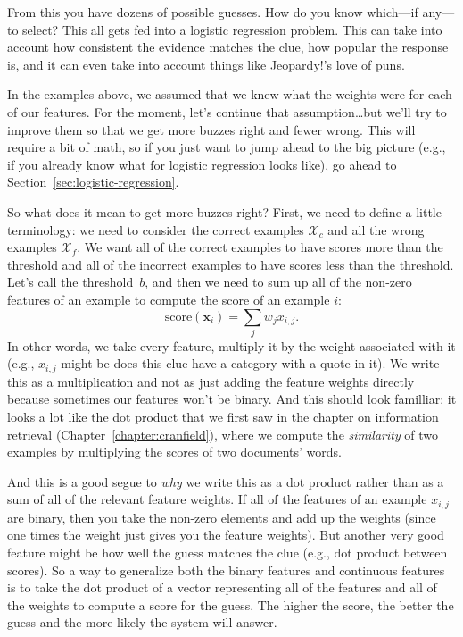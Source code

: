 From this you have dozens of possible guesses.  How do you know which---if
any—to select?  This all gets fed into a logistic regression problem.  This
can take into account how consistent the evidence matches the clue, how
popular the response is, and it can even take into account things like
Jeopardy!’s love of puns.

In the examples above, we assumed that we knew what the weights were for each
of our features.
%
For the moment, let's continue that assumption\dots but we'll try to improve
them so that we get more buzzes right and fewer wrong.
%
This will require a bit of math, so if you just want to jump ahead to the big
picture (e.g., if you already know what  for logistic regression
looks like), go ahead to Section~\ref{sec:logistic-regression}.

So what does it mean to get more buzzes right?  First, we need to define a
little terminology: we need to consider the correct examples $\mathcal{X}_c$
and all the wrong examples $\mathcal{X}_f$.
%
We want all of the correct examples to have scores more than the threshold and
all of the incorrect examples to have scores less than the threshold.
%
Let's call the threshold~$b$, and then we need to sum up all of the non-zero
features of an example to compute the score of an example $i$:
\begin{equation}
  \mbox{score}({\bm x}_i) = \sum_{j} w_j x_{i,j}.
  \label{eq:lr-dot}
\end{equation}
In other words, we take every feature, multiply it by the weight associated
with it (e.g., $x_{i,j}$ might be does this clue have a category with a quote
in it).
%
We write this as a multiplication and not as just adding the feature weights
directly because sometimes our features won't be binary.
%
And this should look familliar: it looks a lot like the dot product that we
first saw in the chapter on information retrieval
(Chapter~\ref{chapter:cranfield}), where we compute the \emph{similarity} of
two examples by multiplying the \tfidf{} scores of two documents' words.

And this is a good segue to \emph{why} we write this as a dot product rather
than as a sum of all of the relevant feature weights.
%
If all of the features of an example $x_{i,j}$ are binary, then you take the
non-zero elements and add up the weights (since one times the weight just
gives you the feature weights).
%
But another very good feature might be how well the guess matches the clue
(e.g., dot product between \tfidf{} scores).
%
So a way to generalize both the binary features and continuous features is to
take the dot product of a vector representing all of the features and all of
the weights to compute a score for the guess.
%
The higher the score, the better the guess and the more likely the system will
answer.

